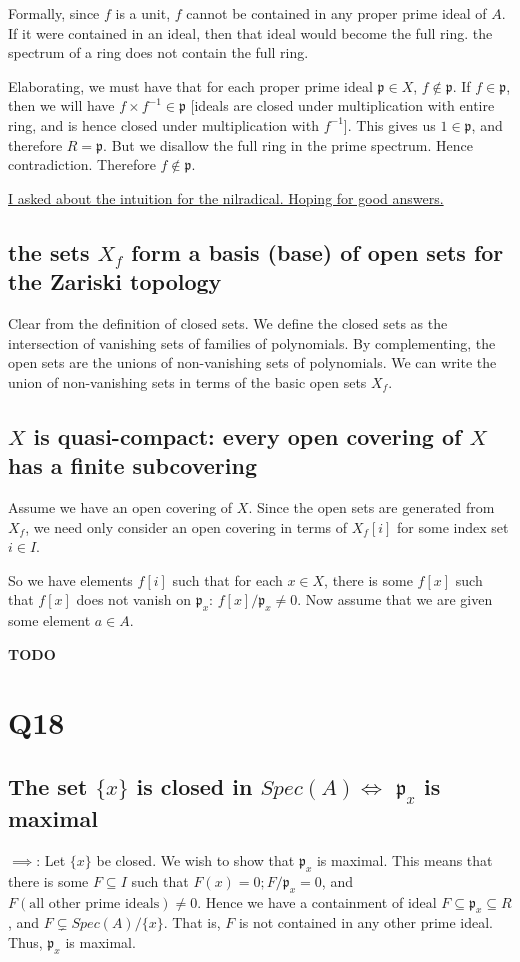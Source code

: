 \documentclass{book}
\newcommand{\frakp}{\ensuremath{\mathfrak{p}}}
\theoremstyle{definition}
\begin{document}
Formally, since $f$ is a unit, $f$ cannot be contained in any proper prime ideal of $A$.
If it were contained in an ideal, then that ideal would become the full ring. the spectrum
of a ring does not contain the full ring.

Elaborating, we must have that for each proper prime ideal $\frakp \in X$, $f \not \in \frakp$.
If $f \in \frakp$, then we will have $f \times f^{-1} \in \frakp$
[ideals are closed under multiplication with entire ring, and
is hence closed under multiplication with $f^{-1}$].
This gives us $1 \in \frakp$, and therefore $R = \frakp$.
But we disallow the full ring in the prime spectrum. Hence contradiction. Therefore
$f \not \in \frakp$.


\href{https://math.stackexchange.com/questions/3751728/geometric-meaning-of-the-nilradical}{I asked about the intuition for the nilradical. Hoping for good answers.}

\subsection{the sets $X_f$ form a basis (base) of open sets for the Zariski  topology}

Clear from the definition of closed sets. We define the closed sets as the
intersection of vanishing sets of families of polynomials. By complementing, the
open sets are the unions of non-vanishing sets of polynomials. We can write the
union of non-vanishing sets in terms of the basic open sets $X_f$.


\subsection{$X$ is quasi-compact: every open covering of $X$ has a finite subcovering}

Assume we have an open covering of $X$. Since the open sets are generated from
$X_f$, we need only consider an open covering in terms of $X_f[i]$ for some
index set $i \in I$.


So we have elements $f[i]$ such that for each $x \in X$, there is some $f[x]$ 
such that $f[x]$ does not vanish on $\frakp_x$: $f[x] / \frakp_x \neq 0$.
Now assume that we are given some element $a \in A$. 

\textbf{TODO}

\section{Q18}
\subsection{The set $\{ x \}$ is closed in $Spec(A) \iff $ $\frakp_x$ is maximal}
$\implies$: Let $\{ x\}$ be closed. We wish to show that $\frakp_x$ is maximal.
This means that there is some $F \subseteq I$ such that 
$F(x) = 0; F / \frakp_x = 0$, and $F(\text{all other prime ideals}) \neq 0$. Hence
we have a containment of ideal $F \subseteq \frakp_x \subseteq R$, and $F \subsetneq Spec(A)/\{ x\}$.
That is, $F$ is not contained in any other prime ideal. Thus, $\frakp_x$ is maximal.
\end{document}
